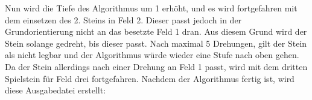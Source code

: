 Nun wird die Tiefe des Algorithmus um 1 erhöht, und es wird fortgefahren mit dem einsetzen des 2. Steins in Feld 2. Dieser passt jedoch in der Grundorientierung nicht an das besetzte Feld 1 dran. Aus diesem Grund wird der Stein solange gedreht, bis dieser passt. Nach maximal 5 Drehungen, gilt der Stein als nicht legbar und der Algorithmus würde wieder eine Stufe nach oben gehen.
Da der Stein allerdings nach einer Drehung an Feld 1 passt, wird mit dem dritten Spielstein für Feld drei fortgefahren.
Nachdem der Algorithmus fertig ist, wird diese Ausgabedatei erstellt:

%

\cleardoublepage